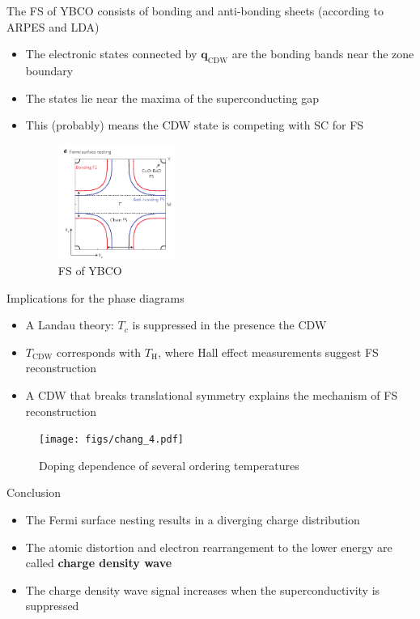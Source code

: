 \documentclass{beamer}
\newcommand*\vf[1]{\mathbf{#1}}
\begin{document}
\begin{frame}{The FS of YBCO consists of bonding and anti-bonding sheets (according to ARPES and LDA)}
\begin{itemize}
\item The electronic states connected by $\vf{q}_{\text{CDW}}$ are the bonding bands near the zone boundary
\item The states lie near the maxima of the superconducting gap
\item This (probably) means the CDW state is competing with SC for FS
\begin{figure}
\includegraphics[width=1.5in]{figs/chang_3.pdf}
\caption{\label{fig:chang_3} FS of YBCO}
\end{figure}
\end{itemize}
\end{frame}

\begin{frame}{Implications for the phase diagrams}
\begin{itemize}
\item A Landau theory: $T_c$ is suppressed in the presence the CDW
\item $T_{\text{CDW}}$ corresponds with $T_\text{H}$, where Hall effect measurements suggest FS reconstruction
\item A CDW that breaks translational symmetry explains the mechanism of FS reconstruction
\end{itemize}
\begin{figure}
\texttt{[image: figs/chang\_4.pdf]}
\caption{\label{fig:chang_4} Doping dependence of several ordering temperatures}
\end{figure}
\end{frame}

\begin{frame}{Conclusion}
\begin{itemize}
\item The Fermi surface nesting results in a diverging charge distribution
\item The atomic distortion and electron rearrangement to the lower energy are called \textbf{charge density wave}
\item The charge density wave signal increases when the superconductivity is suppressed
\end{itemize}
\end{frame}
\end{document}

